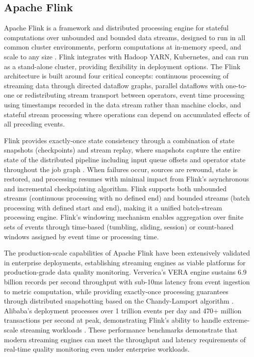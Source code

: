 \subsection{Apache Flink}

Apache Flink is a framework and distributed processing engine for stateful computations over unbounded and bounded data streams, designed to run in all common cluster environments, perform computations at in-memory speed, and scale to any size \citep{flinkdocs2024}. Flink integrates with Hadoop YARN, Kubernetes, and can run as a stand-alone cluster, providing flexibility in deployment options. The Flink architecture is built around four critical concepts: continuous processing of streaming data through directed dataflow graphs, parallel dataflows with one-to-one or redistributing stream transport between operators, event time processing using timestamps recorded in the data stream rather than machine clocks, and stateful stream processing where operations can depend on accumulated effects of all preceding events.

Flink provides exactly-once state consistency through a combination of state snapshots (checkpoints) and stream replay, where snapshots capture the entire state of the distributed pipeline including input queue offsets and operator state throughout the job graph \citep{flinkdocs2024}. When failures occur, sources are rewound, state is restored, and processing resumes with minimal impact from Flink's asynchronous and incremental checkpointing algorithm. Flink supports both unbounded streams (continuous processing with no defined end) and bounded streams (batch processing with defined start and end), making it a unified batch-stream processing engine. Flink's windowing mechanism enables aggregation over finite sets of events through time-based (tumbling, sliding, session) or count-based windows assigned by event time or processing time.

The production-scale capabilities of Apache Flink have been extensively validated in enterprise deployments, establishing streaming engines as viable platforms for production-grade data quality monitoring. Ververica's VERA engine sustains 6.9 billion records per second throughput with sub-10ms latency from event ingestion to metric computation, while providing exactly-once processing guarantees through distributed snapshotting based on the Chandy-Lamport algorithm \citep{ververica2024}. Alibaba's deployment processes over 1 trillion events per day and 470+ million transactions per second at peak, demonstrating Flink's ability to handle extreme-scale streaming workloads \citep{alibaba_flink2024}. These performance benchmarks demonstrate that modern streaming engines can meet the throughput and latency requirements of real-time quality monitoring even under enterprise workloads.


